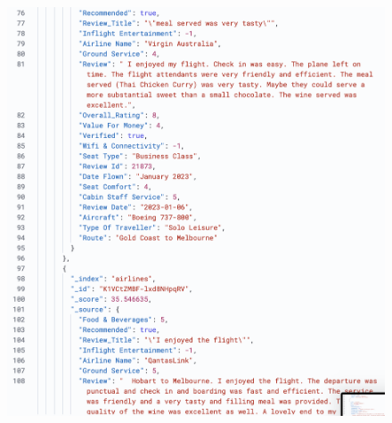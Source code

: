 \documentclass{Configuration_Files/PoliMi3i_thesis}
\begin{document}
\begin{enumerate}
\begin{figure}[H]
{        \includegraphics[scale=0.30]{Images/QueryResults/query2c.png}
    }
    \quad
\end{figure}
\end{enumerate}
\end{document}

